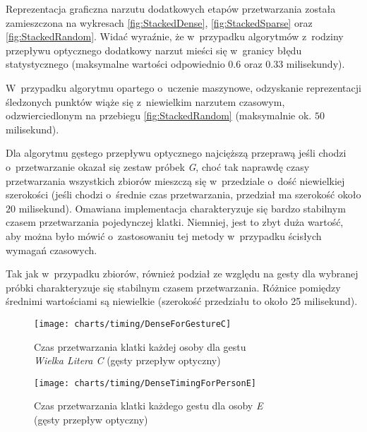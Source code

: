    Reprezentacja graficzna narzutu dodatkowych etapów przetwarzania została zamieszczona na wykresach \ref{fig:StackedDense}, \ref{fig:StackedSparse} oraz \ref{fig:StackedRandom}. Widać wyraźnie, że w~przypadku algorytmów z~rodziny przepływu optycznego dodatkowy narzut mieści się w~granicy błędu statystycznego (maksymalne wartości odpowiednio $0.6$ oraz $0.33$ milisekundy).

    W~przypadku algorytmu opartego o~uczenie maszynowe, odzyskanie reprezentacji śledzonych punktów wiąże się z~niewielkim narzutem czasowym, odzwierciedlonym na przebiegu \ref{fig:StackedRandom} (maksymalnie ok. $50$ milisekund).

    Dla algorytmu gęstego przepływu optycznego najcięższą przeprawą jeśli chodzi o~przetwarzanie okazał się zestaw próbek \textit{G}, choć tak naprawdę czasy przetwarzania wszystkich zbiorów mieszczą się w~przedziale o~dość niewielkiej szerokości (jeśli chodzi o~średnie czas przetwarzania, przedział ma szerokość około $20$ milisekund). Omawiana implementacja charakteryzuje się bardzo stabilnym czasem przetwarzania pojedynczej klatki. Niemniej, jest to zbyt duża wartość, aby można było mówić o~zastosowaniu tej metody w~przypadku ścisłych wymagań czasowych.

    Tak jak w~przypadku zbiorów, również podział ze względu na gesty dla wybranej próbki charakteryzuje się stabilnym czasem przetwarzania. Różnice pomiędzy średnimi wartościami są niewielkie (szerokość przedziału to około 25 milisekund).

      \begin{figure}[!ht]
        \centering
        \texttt{[image: charts/timing/DenseForGestureC]}
        \caption[Czas przetwarzania klatki każdej osoby dla gestu C (gęsty przepływ optyczny)]
                {Czas przetwarzania klatki każdej osoby dla gestu \\\textit{Wielka Litera C} (gęsty przepływ optyczny)}
        \label{fig:DenseForGestureC}
      \end{figure}

      \begin{figure}[!ht]
        \centering
        \texttt{[image: charts/timing/DenseTimingForPersonE]}
        \caption[Czas przetwarzania klatki każdego gestu dla osoby E (gęsty przepływ optyczny)]
                {Czas przetwarzania klatki każdego gestu dla osoby \textit{E}\\(gęsty przepływ optyczny)}
        \label{fig:DenseTimingForPersonE}
      \end{figure}


